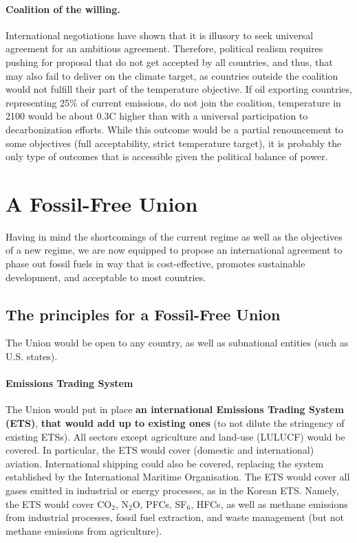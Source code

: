 \documentclass[12pt,english]{article}
\begin{document}
\paragraph{Coalition of the willing.} International negotiations have shown that it is illusory to seek universal agreement for an ambitious agreement. Therefore, political realism requires pushing for proposal that do not get accepted by all countries, and thus, that may also fail to deliver on the climate target, as countries outside the coalition would not fulfill their part of the temperature objective. If oil exporting countries, representing 25\% of current emissions, do not join the coalition, temperature in 2100 would be about 0.3\textdegree{}C higher than with a universal participation to decarbonization efforts. While this outcome would be a partial renouncement to some objectives (full acceptability, strict temperature target), it is probably the only type of outcomes that is accessible given the political balance of power.

\clearpage
\section{A Fossil-Free Union\label{sec:ffu}}

Having in mind the shortcomings of the current regime as well as the objectives of a new regime, we are now equipped to propose an international agreement to phase out fossil fuels in way that is cost-effective, promotes sustainable development, and acceptable to most countries. %

\subsection{The principles for a Fossil-Free Union\label{subsec:principles}}

The Union would be open to any country, as well as subnational entities (such as U.S. states). 

\paragraph{Emissions Trading System}
The Union would put in place \textbf{an international Emissions Trading System (ETS)}, \textbf{that would add up to existing ones} (to not dilute the stringency of existing ETSs). All sectors except agriculture and land-use (LULUCF) would be covered. In particular, the ETS would cover (domestic and international) aviation. International shipping could also be covered, replacing the system established by the International Maritime Organisation. The ETS would cover all gases emitted in industrial or energy processes, as in the Korean ETS. Namely, the ETS would cover CO$_\text{2}$, N$_\text{2}$O, PFCs, SF$_\text{6}$, HFCs, as well as methane emissions from industrial processes, fossil fuel extraction, and waste management (but not methane emissions from agriculture). %
\end{document}
